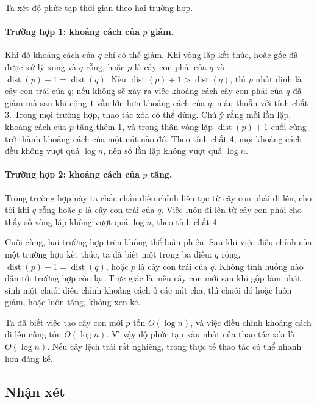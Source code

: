 \documentclass[11pt]{article}
\begin{document}
Ta xét độ phức tạp thời gian theo hai trường hợp.

\paragraph{Trường hợp 1: khoảng cách của \(p\) giảm.}
Khi đó khoảng cách của \(q\) chỉ có thể giảm. Khi vòng lặp kết thúc, hoặc gốc đã
được xử lý xong và \(q\) rỗng, hoặc \(p\) là cây con phải của \(q\) và
\(\operatorname{dist}(p)+1=\operatorname{dist}(q)\). Nếu
\(\operatorname{dist}(p)+1>\operatorname{dist}(q)\), thì \(p\) nhất định là cây
con trái của \(q\); nếu không sẽ xảy ra việc khoảng cách cây con phải của \(q\)
đã giảm mà sau khi cộng \(1\) vẫn lớn hơn khoảng cách của \(q\), mâu thuẫn với
tính chất 3. Trong mọi trường hợp, thao tác xóa có thể dừng. Chú ý rằng mỗi lần
lặp, khoảng cách của \(p\) tăng thêm \(1\), và trong thân vòng lặp
\(\operatorname{dist}(p)+1\) cuối cùng trở thành khoảng cách của một nút nào đó.
Theo tính chất 4, mọi khoảng cách đều không vượt quá \(\log n\), nên số lần lặp
không vượt quá \(\log n\).

\paragraph{Trường hợp 2: khoảng cách của \(p\) tăng.}
Trong trường hợp này ta chắc chắn điều chỉnh liên tục từ cây con phải đi lên,
cho tới khi \(q\) rỗng hoặc \(p\) là cây con trái của \(q\). Việc luôn đi lên từ
cây con phải cho thấy số vòng lặp không vượt quá \(\log n\), theo tính chất 4.

Cuối cùng, hai trường hợp trên không thể luân phiên. Sau khi việc điều chỉnh
của một trường hợp kết thúc, ta đã biết một trong ba điều: \(q\) rỗng,
\(\operatorname{dist}(p)+1=\operatorname{dist}(q)\), hoặc \(p\) là cây con trái
của \(q\). Không tình huống nào dẫn tới trường hợp còn lại. Trực giác là: nếu
cây con mới sau khi gộp làm phát sinh một chuỗi điều chỉnh khoảng cách ở các
nút cha, thì chuỗi đó hoặc luôn giảm, hoặc luôn tăng, không xen kẽ.

Ta đã biết việc tạo cây con mới \(p\) tốn \(O(\log n)\), và việc điều chỉnh
khoảng cách đi lên cũng tốn \(O(\log n)\). Vì vậy độ phức tạp xấu nhất của thao
tác xóa là \(O(\log n)\). Nếu cây lệch trái rất nghiêng, trong thực tế thao tác
có thể nhanh hơn đáng kể.

\subsection{Nhận xét}
\end{document}
